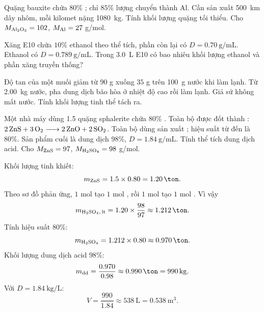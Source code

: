 \begin{tuluyen}
Quặng bauxite chứa \(80\%\) ; chỉ \(85\%\) lượng  chuyển thành Al. Cần sản xuất \SI{500}{\kilo\metre} dây nhôm, mỗi kilomet nặng \SI{1080}{\kilo\gram}. Tính khối lượng quặng tối thiểu. Cho \(M_{\ce{Al2O3}}=102\), \(M_{\ce{Al}}=27\) g/mol.
\end{tuluyen}

\begin{tuluyen}
Xăng E10 chứa \(10\%\) ethanol theo thể tích, phần còn lại có \(D=\SI{0.70}{\gram\per\milli\liter}\). Ethanol có \(D=\SI{0.789}{\gram\per\milli\liter}\). Trong \SI{3.0}{\liter} E10 có bao nhiêu khối lượng ethanol và phần xăng truyền thống?
\end{tuluyen}

\begin{tuluyen}
Độ tan của một muối giảm từ \(90\) g xuống \(35\) g trên \SI{100}{\gram} nước khi làm lạnh. Từ \SI{2.00}{\kilo\gram} nước, pha dung dịch bão hòa ở nhiệt độ cao rồi làm lạnh. Giả sử không mất nước. Tính khối lượng tinh thể tách ra.
\end{tuluyen}

\begin{tuluyen}
Một nhà máy dùng \SI{1.5}{\ton} quặng sphalerite chứa \(80\%\) . Toàn bộ  được đốt thành : \(\ce{2ZnS + 3O2 -> 2ZnO + 2SO2}\). Toàn bộ  dùng sản xuất ; hiệu suất từ  đến  là \(80\%\). Sản phẩm cuối là dung dịch  \(98\%\), \(D=\SI{1.84}{\gram\per\milli\liter}\). Tính thể tích dung dịch acid. Cho \(M_{\ce{ZnS}}=97\), \(M_{\ce{H2SO4}}=98\) g/mol.
\begin{loigiaiBT}
Khối lượng  tinh khiết:
\[
m_{\ce{ZnS}}=1.5\times0.80=\SI{1.20}{\ton}.
\]
Theo sơ đồ phản ứng, \(1\) mol  tạo \(1\) mol , rồi \(1\) mol  tạo \(1\) mol . Vì vậy
\[
m_{\ce{H2SO4,lt}}=1.20\times\frac{98}{97}\approx\SI{1.212}{\ton}.
\]
Tính hiệu suất \(80\%\):
\[
m_{\ce{H2SO4}}=1.212\times0.80\approx\SI{0.970}{\ton}.
\]
Khối lượng dung dịch acid \(98\%\):
\[
m_{\text{dd}}=\frac{0.970}{0.98}\approx\SI{0.990}{\ton}=\SI{990}{\kilo\gram}.
\]
Với \(D=\SI{1.84}{\kilo\gram\per\liter}\):
\[
V=\frac{990}{1.84}\approx\SI{538}{\liter}=\SI{0.538}{\cubic\metre}.
\]
\end{loigiaiBT}
\end{tuluyen}


